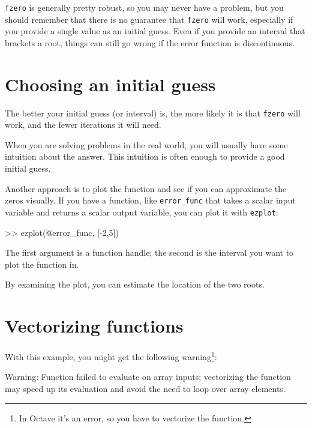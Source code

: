 \documentclass[
]{book}
\numberwithin{Answer}{chapter}
\numberwithin{Exercise}{chapter}
\begin{document}
{\tt fzero} is generally pretty robust, so you may never have a problem, but you should remember that there is no guarantee that {\tt fzero} will work, especially if you provide a single value as an initial guess.  Even if you provide an interval that brackets a root, things can still go wrong if the error function is discontinuous.


\section{Choosing an initial guess}

The better your initial guess (or interval) is, the more likely
it is that {\tt fzero} will work, and the fewer iterations it will
need.

When you are solving problems in the real world, you will usually
have some intuition about the answer.  This intuition is often enough
to provide a good initial guess.


Another approach is to plot the function and see if you can
approximate the zeros visually.  If you have a function, like
{\tt error\_func} that takes a scalar input variable and returns
a scalar output variable, you can plot it with {\tt ezplot}:

\begin{code}
>> ezplot(@error_func, [-2,5])
\end{code}


The first argument is a function handle; the second is the interval you want to plot the function in.

By examining the plot, you can estimate the location of the two roots.


\section{Vectorizing functions}


With this example, you might get the following warning\footnote{In Octave it's an error, so you have to vectorize the function.}:

\begin{code}
Warning: Function failed to evaluate on array inputs;
vectorizing the function may speed up its evaluation and 
avoid the need to loop over array elements. 
\end{code}
\end{document}
